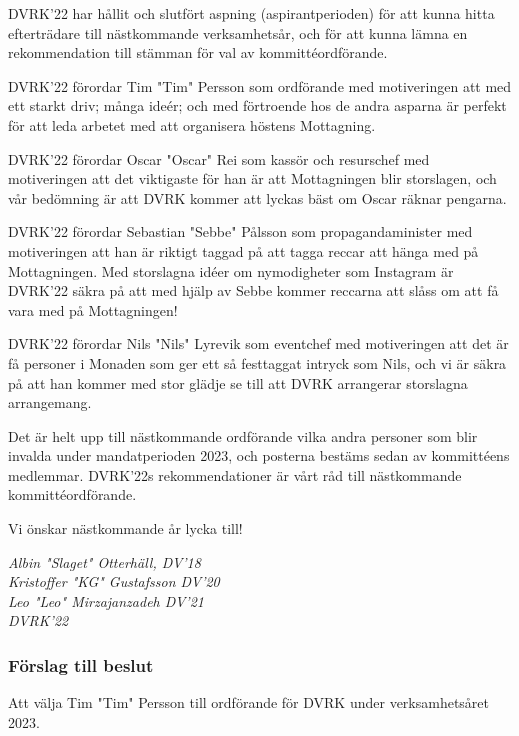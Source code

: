 \documentclass[protokoll]{dvd}
\begin{document}
DVRK'22 har hållit och slutfört aspning (aspirantperioden) för att kunna hitta efterträdare till nästkommande verksamhetsår, och för att kunna lämna en rekommendation till stämman för val av kommittéordförande.

DVRK'22 förordar Tim "Tim" Persson som ordförande med motiveringen att med ett starkt driv; många ideér; och med förtroende hos de andra asparna är perfekt för att leda arbetet med att organisera höstens Mottagning.

DVRK'22 förordar Oscar "Oscar" Rei som kassör och resurschef med motiveringen att det viktigaste för han är att Mottagningen blir storslagen, och vår bedömning är att DVRK kommer att lyckas bäst om Oscar räknar pengarna.

DVRK'22 förordar Sebastian "Sebbe" Pålsson som propagandaminister med motiveringen att han är riktigt taggad på att tagga reccar att hänga med på Mottagningen.
Med storslagna idéer om nymodigheter som Instagram är DVRK'22 säkra på att med hjälp av Sebbe kommer reccarna att slåss om att få vara med på Mottagningen!

DVRK'22 förordar Nils "Nils" Lyrevik som eventchef med motiveringen att det är få personer i Monaden som ger ett så festtaggat intryck som Nils, och vi är säkra på att han kommer med stor glädje se till att DVRK arrangerar storslagna arrangemang.

Det är helt upp till nästkommande ordförande vilka andra personer som blir invalda under mandatperioden 2023, och posterna bestäms sedan av kommittéens medlemmar.
DVRK'22s rekommendationer är vårt råd till nästkommande kommittéordförande.

Vi önskar nästkommande år lycka till!

\emph{Albin "Slaget" Otterhäll, DV'18} \\
\emph{Kristoffer "KG" Gustafsson DV'20} \\
\emph{Leo "Leo" Mirzajanzadeh DV'21}\\
\emph{DVRK'22}

\subsubsection*{Förslag till beslut}
\begin{attsatser}
    \item Att välja Tim "Tim" Persson till ordförande för DVRK under verksamhetsåret 2023.
\end{attsatser}

\end{document}
